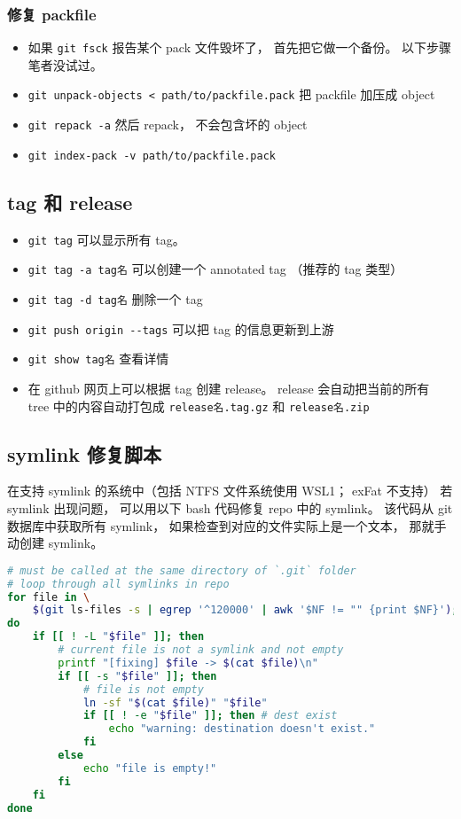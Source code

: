 \subsubsection{修复 packfile}
\begin{itemize}
\item 如果 \verb`git fsck` 报告某个 pack 文件毁坏了， 首先把它做一个备份。 以下步骤笔者没试过。
\item \verb`git unpack-objects < path/to/packfile.pack` 把 packfile 加压成 object
\item \verb`git repack -a` 然后 repack， 不会包含坏的 object
\item \verb`git index-pack -v path/to/packfile.pack` 
\end{itemize}

\subsection{tag 和 release}
\begin{itemize}
\item \verb`git tag` 可以显示所有 tag。
\item \verb`git tag -a tag名` 可以创建一个 annotated tag （推荐的 tag 类型）
\item \verb`git tag -d tag名` 删除一个 tag
\item \verb`git push origin --tags` 可以把 tag 的信息更新到上游
\item \verb`git show tag名` 查看详情
\item 在 github 网页上可以根据 tag 创建 release。 release 会自动把当前的所有 tree 中的内容自动打包成 \verb`release名.tag.gz` 和 \verb`release名.zip`
\end{itemize}

\subsection{symlink 修复脚本}

在支持 symlink 的系统中（包括 NTFS 文件系统使用 WSL1； exFat 不支持） 若 symlink 出现问题， 可以用以下 bash 代码修复 repo 中的 symlink。 该代码从 git 数据库中获取所有 symlink， 如果检查到对应的文件实际上是一个文本， 那就手动创建 symlink。

\begin{lstlisting}[language=bash, caption=fix\_git\_symlink.sh]
# must be called at the same directory of `.git` folder
# loop through all symlinks in repo
for file in \
	$(git ls-files -s | egrep '^120000' | awk '$NF != "" {print $NF}');
do
	if [[ ! -L "$file" ]]; then
		# current file is not a symlink and not empty
		printf "[fixing] $file -> $(cat $file)\n"
		if [[ -s "$file" ]]; then
			# file is not empty
			ln -sf "$(cat $file)" "$file"
			if [[ ! -e "$file" ]]; then # dest exist
				echo "warning: destination doesn't exist."
			fi
		else
			echo "file is empty!"
		fi
	fi
done
\end{lstlisting}

